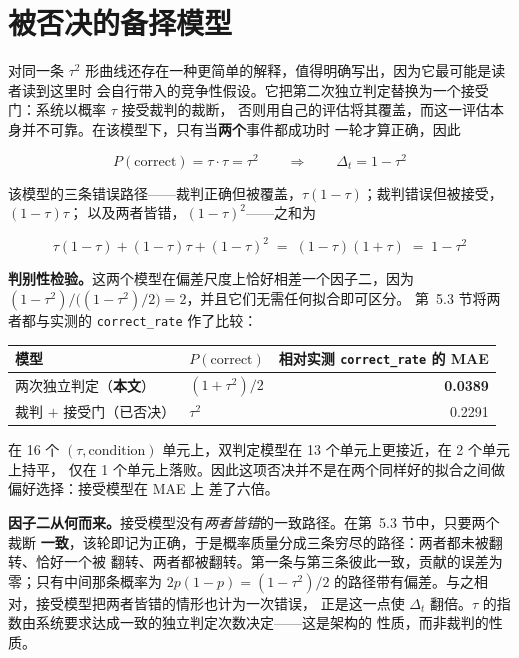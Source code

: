\section{被否决的备择模型}

对同一条 $\tau^{2}$ 形曲线还存在一种更简单的解释，值得明确写出，因为它最可能是读者读到这里时
会自行带入的竞争性假设。它把第二次独立判定替换为一个接受门：系统以概率 $\tau$ 接受裁判的裁断，
否则用自己的评估将其覆盖，而这一评估本身并不可靠。在该模型下，只有当\textbf{两个}事件都成功时
一轮才算正确，因此

\[
  P(\text{correct}) = \tau \cdot \tau = \tau^{2}
  \qquad\Longrightarrow\qquad
  \Delta_t = 1 - \tau^{2}
\]

该模型的三条错误路径——裁判正确但被覆盖，$\tau(1-\tau)$；裁判错误但被接受，$(1-\tau)\tau$；
以及两者皆错，$(1-\tau)^{2}$——之和为

\[
  \tau(1-\tau) + (1-\tau)\tau + (1-\tau)^{2} \;=\; (1-\tau)(1+\tau) \;=\; 1-\tau^{2}
\]

\textbf{判别性检验。}这两个模型在偏差尺度上恰好相差一个因子二，因为
$(1-\tau^{2}) \big/ \bigl((1-\tau^{2})/2\bigr) = 2$，并且它们无需任何拟合即可区分。
第~5.3 节将两者都与实测的 \texttt{correct\_rate} 作了比较：

\begin{center}
\small
\begin{tabular}{@{}llr@{}}
  \toprule
  模型 & $P(\text{correct})$ & 相对实测 \texttt{correct\_rate} 的 MAE \\
  \midrule
  两次独立判定（\textbf{本文}） & $(1 + \tau^{2})/2$ & \textbf{0.0389} \\
  裁判 $+$ 接受门（已否决） & $\tau^{2}$ & 0.2291 \\
  \bottomrule
\end{tabular}
\end{center}

在 16 个 $(\tau, \text{condition})$ 单元上，双判定模型在 13 个单元上更接近，在 2 个单元上持平，
仅在 1 个单元上落败。因此这项否决并不是在两个同样好的拟合之间做偏好选择：接受模型在 MAE 上
差了六倍。

\textbf{因子二从何而来。}接受模型没有\textit{两者皆错}的一致路径。在第~5.3 节中，只要两个裁断
\textbf{一致}，该轮即记为正确，于是概率质量分成三条穷尽的路径：两者都未被翻转、恰好一个被
翻转、两者都被翻转。第一条与第三条彼此一致，贡献的误差为零；只有中间那条概率为
$2p(1-p) = (1-\tau^{2})/2$ 的路径带有偏差。与之相对，接受模型把两者皆错的情形也计为一次错误，
正是这一点使 $\Delta_t$ 翻倍。$\tau$ 的指数由系统要求达成一致的独立判定次数决定——这是架构的
性质，而非裁判的性质。

